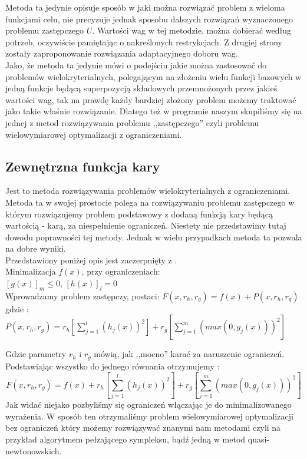 \documentclass{classrep}
\begin{document}
Metoda ta jedynie opisuje sposób w jaki można rozwiązać problem z wieloma funkcjami celu, nie precyzuje jednak sposobu dalszych rozwiązań   wyznaczonego problemu zastępczego $U$. Wartości wag w tej metodzie, można dobierać według potrzeb, oczywiście pamiętając o nakreślonych restrykcjach. Z drugiej strony zostały zaproponowanie rozwiązania adaptacyjnego doboru wag.\\

Jako, że metoda ta jedynie mówi o podejściu jakie można zastosować do problemów wielokryterialnych, polegającym na złożeniu wielu funkcji bazowych w jedną funkcje będącą superpozycją składowych przemnożonych przez jakieś wartości wag, tak na prawdę każdy bardziej złożony problem możemy traktować jako takie właśnie rozwiązanie. Dlatego też w programie naszym skupiliśmy się na jednej z metod rozwiązywania problemu ,,zastępczego'' czyli problemu wielowymiarowej optymalizacji z ograniczeniami.


\subsection{Zewnętrzna funkcja kary}

Jest to metoda rozwiązywania problemów wielokryterialnych z ograniczeniami. Metoda ta w swojej prostocie polega na rozwiązywaniu problemu zastępczego w którym rozwiązujemy problem podstawowy z dodaną funkcją kary będącą wartością - karą, za niespełnienie ograniczeń. Niestety nie przedstawimy tutaj dowodu poprawności tej metody. Jednak w wielu przypadkach metoda ta pozwala na dobre wyniki.\\
Przedstawiony poniżej opis jest zaczerpnięty z \cite{3}.\\

Minimalizacja $f(x)$, przy ograniczeniach:\\
$[g(x)]_m\leq0$, $[h(x)]_l=0$\\

Wprowadzamy problem zastępczy, postaci: $F(x,r_h, r_g) = f(x) + P(x,r_h, r_g)$\\
gdzie : $P(x,r_h, r_g)=r_h \left[ \sum \limits ^{l} _{j=1} (h_j(x))^{2} \right]  + r_g \left[ \sum \limits ^{m} _{j=1}
 \left( max \left( 0, g_j (x) \right) \right) ^{2} \right]$


Gdzie parametry $r_h$ i $r_g$ mówią, jak ,,mocno'' karać za naruszenie ograniczeń. Podstawiając wszystko do jednego równania otrzymujemy :\\
\begin{equation}
 F(x,r_h, r_g) = f(x) + r_h \left[ \sum \limits ^{l} _{j=1} (h_j(x))^{2} \right]  + r_g \left[ \sum \limits ^{m} _{j=1}
 \left( max \left( 0, g_j (x) \right) \right) ^{2} \right]
\end{equation}
Jak widać niejako pozbyliśmy się ograniczeń włączając je do minimalizowanego wyrażenia. W sposób ten otrzymaliśmy problem wielowymiarowej optymalizacji bez ograniczeń który możemy rozwiązywać znanymi nam metodami czyli na przykład algorytmem pełzającego sympleksu, bądź jedną w metod quasi-newtonowskich.
\end{document}
